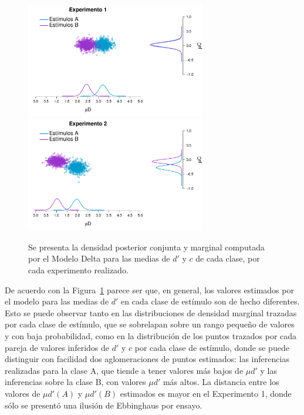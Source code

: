 \begin{figure}[th]
\centering
\includegraphics[width=0.7\textwidth]{Figures/MDelta_Joint_E1}\\
\includegraphics[width=0.7\textwidth]{Figures/MDelta_Joint_E2}\\
\caption[Modelo Delta: Distribuciones posteriores marginales y conjuntas para $\mu d'$ y $\mu c$ por cada clase de estímulo]{Se presenta la densidad posterior conjunta y marginal computada por el Modelo Delta para las medias de $d'$ y $c$ de cada clase, por cada experimento realizado.}
\label{fig:Delta_Joints}
\end{figure}

De acuerdo con la Figura~\ref{fig:Delta_Joints} parece ser que, en general, los valores estimados por el modelo para las medias de $d'$ en cada clase de estímulo son de hecho diferentes. Esto se puede observar tanto en las distribuciones de densidad marginal trazadas por cada clase de estímulo, que se sobrelapan sobre un rango pequeño de valores y con baja probabilidad, como en la distribución de los puntos trazados por cada pareja de valores inferidos de $d'$ y $c$ por cada clase de estímulo, donde se puede distinguir con facilidad dos aglomeraciones de puntos estimados: las inferencias realizadas para la clase A, que tiende a tener valores más bajos de $\mu d'$ y las inferencias sobre la clase B, con valores $\mu d'$ más altos. La distancia entre los valores de $\mu d'(A)$ y $\mu d'(B)$ estimados es mayor en el Experimento 1, donde sólo se presentó una ilusión de Ebbinghaus por ensayo.\\


